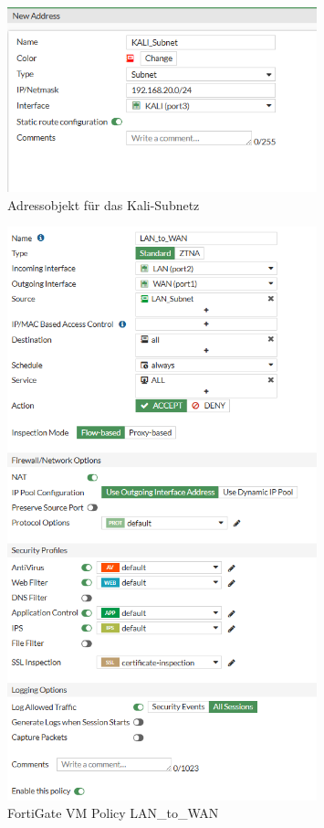 \documentclass[12pt]{scrreprt}
\begin{document}
\begin{thebibliography}{99}
\begin{figure}[htbp]
	\centering
	\includegraphics[width=0.8\textwidth]{forti-Kali-addr.png}
	\caption{Adressobjekt für das Kali-Subnetz}
	\label{fig:forti-Kali-addr} %
\end{figure}

\begin{figure}[htbp]
	\centering
	\includegraphics[width=0.8\textwidth]{forti-LAN-WAN-Policy01.png}
	\caption{FortiGate VM Policy LAN\_to\_WAN}
	\label{fig:forti-LAN-WAN-P01} %
\end{figure}


\end{thebibliography}
\end{document}
